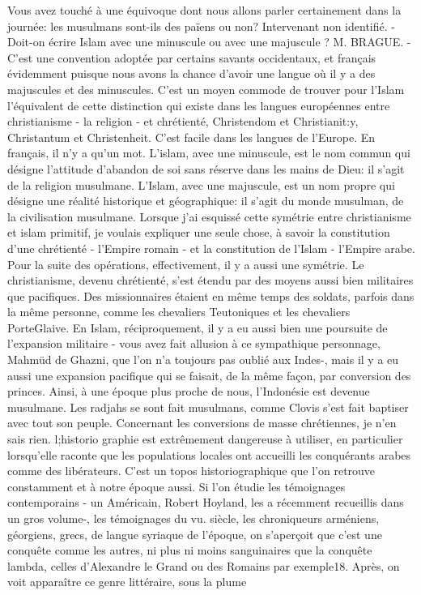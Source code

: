 Vous avez touché à une équivoque dont nous allons parler certainement dans la journée: les musulmans sont-ils des païens ou non?
Intervenant non identifié. - Doit-on écrire Islam avec une minuscule ou avec une majuscule ?
\newline M. BRAGUE. -  C'est une convention adoptée par certains savants occidentaux, et français évidemment puisque nous avons la chance d'avoir une langue où il y a des majuscules et des minuscules. C'est un moyen commode de trouver pour l'Islam l'équivalent de cette distinction qui existe dans les langues européennes entre christianisme - la religion - et chrétienté, Christendom et Christianit:y, Christantum et Christenheit. C'est facile dans les langues de l'Europe. En français, il n'y a qu'un mot.
L'islam, avec une minuscule, est le nom commun qui désigne l'attitude d'abandon de soi sans réserve dans les mains de Dieu: il s'agit de la religion musulmane. L'Islam, avec une majuscule, est un nom propre qui désigne une réalité historique et géographique: il s'agit du monde musulman, de la civilisation musulmane.
Lorsque j'ai esquissé cette symétrie entre christianisme et islam primitif, je voulais expliquer une seule chose, à savoir la constitution d'une chrétienté - l'Empire romain - et la constitution de l'Islam - l'Empire arabe. Pour la suite des opérations, effectivement, il y a aussi une symétrie. Le christianisme, devenu chrétienté, s'est étendu par des moyens aussi bien militaires que pacifiques. Des missionnaires étaient en même temps des soldats, parfois dans la même personne, comme les chevaliers Teutoniques et les chevaliers PorteGlaive. En Islam, réciproquement, il y a eu aussi bien une poursuite de l'expansion militaire - vous avez fait allusion à ce sympathique personnage, Mahmüd de Ghazni, que l'on n'a toujours pas oublié aux Indes-, mais il y a eu aussi une expansion pacifique qui se faisait, de la même façon, par conversion des princes. Ainsi, à une époque plus proche de nous, l'Indonésie est devenue musulmane. Les radjahs se sont fait musulmans, comme Clovis s'est fait baptiser avec tout son peuple.
Concernant les conversions de masse chrétiennes, je n'en sais rien. l;historio 
graphie est extrêmement dangereuse à utiliser, en particulier lorsqu'elle raconte que les populations locales ont accueilli les conquérants arabes comme des libérateurs. C'est un topos historiographique que l'on retrouve constamment et à notre époque aussi. Si l'on étudie les témoignages contemporains - un Américain, Robert Hoyland, les a récemment recueillis dans un gros volume-, les témoignages du vu. siècle, les chroniqueurs arméniens, géorgiens, grecs, de langue syriaque de l'époque, on s'aperçoit que c'est une conquête comme les autres, ni plus ni moins sanguinaires que la conquête lambda, celles d'Alexandre le Grand ou des Romains par exemple18. Après, on voit apparaître ce genre littéraire, sous la plume
